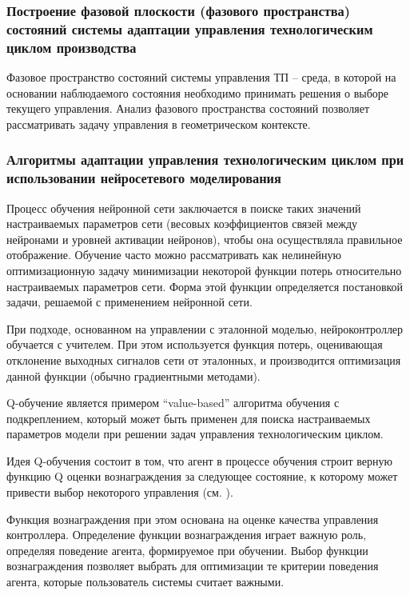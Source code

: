 \subsubsection{Построение фазовой плоскости (фазового пространства) состояний системы адаптации управления технологическим циклом производства}

Фазовое пространство состояний системы управления ТП – среда, в которой на основании наблюдаемого состояния необходимо принимать решения о выборе текущего управления. Анализ фазового пространства состояний позволяет рассматривать задачу управления в геометрическом контексте. 


\subsubsection{Алгоритмы адаптации управления технологическим циклом при использовании нейросетевого моделирования}

Процесс обучения нейронной сети заключается в поиске таких значений настраиваемых параметров сети (весовых коэффициентов связей между нейронами и уровней активации нейронов), чтобы она осуществляла правильное отображение. Обучение часто можно рассматривать как нелинейную оптимизационную задачу минимизации некоторой функции потерь относительно настраиваемых параметров сети. Форма этой функции определяется постановкой задачи, решаемой с применением нейронной сети.

При подходе, основанном на управлении с эталонной моделью, нейроконтроллер обучается с учителем. При этом используется функция потерь, оценивающая отклонение выходных сигналов сети от эталонных, и производится оптимизация данной функции (обычно градиентными методами).


Q-обучение  является примером ``value-based'' алгоритма обучения с подкреплением, который может быть применен для поиска настраиваемых параметров модели при решении задач управления технологическим циклом.


Идея Q-обучения состоит в том, что агент в процессе обучения строит верную функцию Q оценки вознаграждения за следующее состояние, к которому может привести выбор некоторого управления (см. ).


Функция вознаграждения при этом основана на оценке качества управления контроллера. Определение функции вознаграждения играет важную роль, определяя поведение агента, формируемое при обучении. Выбор функции вознаграждения позволяет выбрать для оптимизации те критерии поведения агента, которые пользователь системы считает важными.


